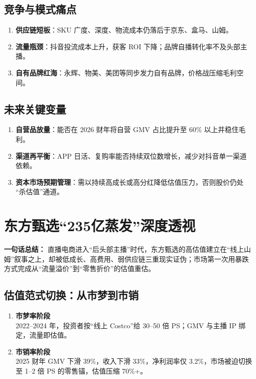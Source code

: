 \subsection{竞争与模式痛点}
\begin{enumerate}[leftmargin=*, nosep]
    \item \textbf{供应链短板}：SKU 广度、深度、物流成本仍落后于京东、盒马、山姆。  
    \item \textbf{流量瓶颈}：抖音投流成本上升，获客 ROI 下降；品牌自播转化率不及头部主播。  
    \item \textbf{自有品牌红海}：永辉、物美、美团等同步发力自有品牌，价格战压缩毛利空间。
\end{enumerate}

\subsection{未来关键变量}
\begin{enumerate}[leftmargin=*, nosep]
    \item \textbf{自营品放量}：能否在 2026 财年将自营 GMV 占比提升至 60\% 以上并稳住毛利。  
    \item \textbf{渠道再平衡}：APP 日活、复购率能否持续双位数增长，减少对抖音单一渠道依赖。  
    \item \textbf{资本市场预期管理}：需以持续高成长或高分红降低估值压力，否则股价仍处 “杀估值”通道。
\end{enumerate}


\section{东方甄选“235亿蒸发”深度透视}
\textbf{一句话总结：}  
直播电商进入“后头部主播”时代，东方甄选的高估值建立在{\color{red}“线上山姆”}叙事之上，却被低成长、高费用、弱供应链三重现实证伪；{\color{red}市场第一次用暴跌方式完成从“流量溢价”到“零售折价”的估值重估}。

\subsection{估值范式切换：从市梦到市销}
\begin{enumerate}[leftmargin=*, nosep]
    \item \textbf{{\color{red}市梦率}阶段}  \\
    2022–2024 年，投资者按“线上 Costco”给 30–50 倍 PS；GMV 与主播 IP 绑定，流量即估值。
    \item \textbf{市销率阶段}  \\
    2025 财年 GMV 下滑 39\%，收入下滑 33\%，净利润率仅 3.2\%，市场被迫切换至 1–2 倍 PS 的零售锚，估值压缩 70\%+。
\end{enumerate}

